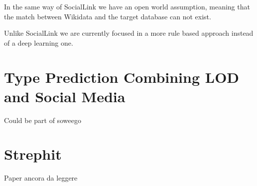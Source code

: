 In the same way of SocialLink\cite{DBLP:conf/sac/NechaevCG17} we have an open world assumption, meaning that the match between Wikidata and the target database can not exist.

Unlike SocialLink we are currently focused in a more rule based approach instead of a deep learning one.

\section{Type Prediction Combining LOD and Social Media}
\label{cha:12}
Could be part of soweego

\section{Strephit}
\label{cha:13}
Paper ancora da leggere

